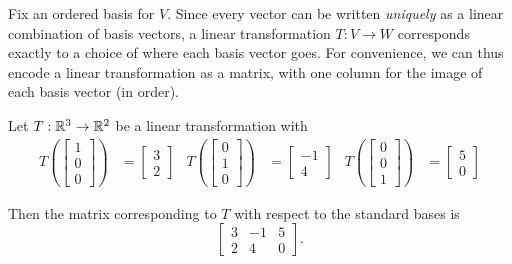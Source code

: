 \begin{applicationActivities}{1}{17}
\begin{observation}
Fix an ordered basis for $V$.  Since every vector can be written \textit{uniquely} as a linear combination of basis vectors, a linear transformation $T:V \rightarrow W$ corresponds exactly to a choice of where each basis vector goes.  For convenience, we can thus encode a linear transformation as a matrix, with one column for the image of each basis vector (in order).
\end{observation}

\begin{example}
Let $T: \mathbb{R}^3 \rightarrow \mathbb{R}^2$ be a linear transformation with
\begin{align*}
T\left(\begin{bmatrix} 1 \\ 0 \\ 0 \end{bmatrix} \right) &= \begin{bmatrix} 3 \\ 2\end{bmatrix} &
T\left(\begin{bmatrix} 0 \\ 1 \\ 0 \end{bmatrix} \right) &= \begin{bmatrix} -1 \\ 4\end{bmatrix} &
T\left(\begin{bmatrix} 0 \\ 0 \\ 1 \end{bmatrix} \right) &= \begin{bmatrix} 5 \\ 0\end{bmatrix}
\end{align*}

Then the matrix corresponding to $T$ with respect to the standard bases is $$\begin{bmatrix}3 & -1 & 5 \\ 2 & 4 & 0 \end{bmatrix}.$$
\end{example}


\end{applicationActivities}
